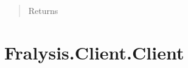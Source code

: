 \documentclass[letterpaper,10pt,english]{sphinxmanual}
\begin{document}
\begin{fulllineitems}
\begin{fulllineitems}
\begin{quote}
\begin{description}
\item[{Returns}] \leavevmode


\end{description}\end{quote}

\end{fulllineitems}


\end{fulllineitems}



\chapter{Fralysis.Client.Client}
\label{\detokenize{index:fralysis-client-client}}
\end{document}
